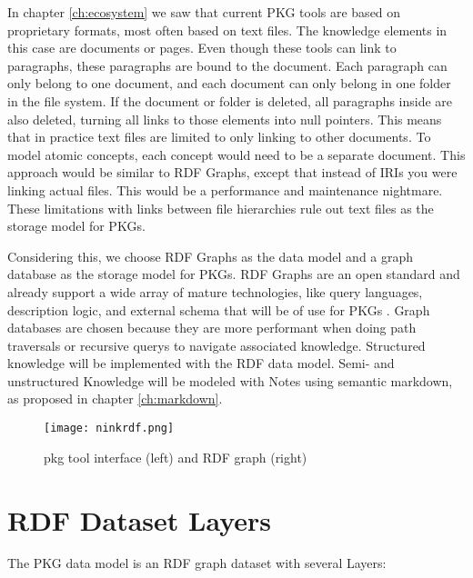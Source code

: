 In chapter \ref{ch:ecosystem} we saw that current PKG tools are based on proprietary formats, most often based on text files. The knowledge elements in this case are documents or pages. Even though these tools can link to paragraphs, these paragraphs are bound to the document. Each paragraph can only belong to one document, and each document can only belong in one folder in the file system. If the document or folder is deleted, all paragraphs inside are also deleted, turning all links to those elements into null pointers. This means that in practice text files are limited to only linking to other documents. To model atomic concepts, each concept would need to be a separate document. This approach would be similar to RDF Graphs, except that instead of IRIs you were linking actual files. This would be a performance and maintenance nightmare. These limitations with links between file hierarchies rule out text files as the storage model for PKGs.

Considering this, we choose RDF Graphs as the data model and a graph database as the storage model for PKGs. RDF Graphs are an open standard and already support a wide array of mature technologies, like query languages, description logic, and external schema that will be of use for PKGs \cite{sparql, owl}. Graph databases are chosen because they are more performant when doing path traversals or recursive querys to navigate associated knowledge. Structured knowledge will be implemented with the RDF data model. Semi- and unstructured Knowledge will be modeled with Notes using semantic markdown, as proposed in chapter \ref{ch:markdown}.

\begin{figure}[h]
  \centering
  \texttt{[image: ninkrdf.png]}
  \caption{pkg tool interface (left) and RDF graph (right)}
  \label{fig:ninkrdf}
  \end{figure}

\section{RDF Dataset Layers}

The PKG data model is an RDF graph dataset with several Layers:

